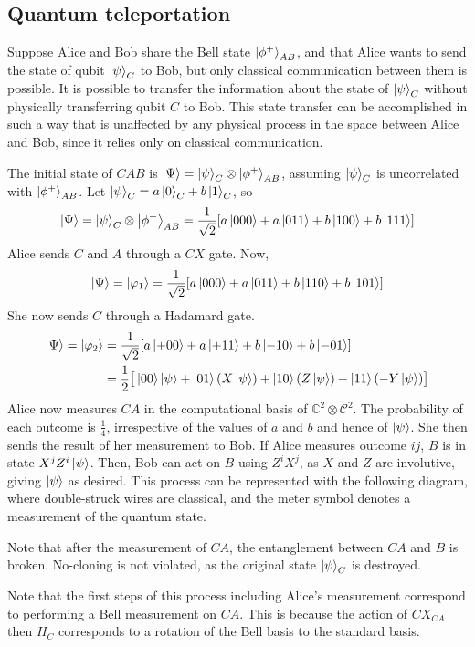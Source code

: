 \subsection{Quantum teleportation}
Suppose Alice and Bob share the Bell state \( \ket{\phi^+}_{AB} \), and that Alice wants to send the state of qubit \( \ket{\psi}_C \) to Bob, but only classical communication between them is possible.
It is possible to transfer the information about the state of \( \ket{\psi}_C \) without physically transferring qubit \( C \) to Bob.
This state transfer can be accomplished in such a way that is unaffected by any physical process in the space between Alice and Bob, since it relies only on classical communication.

The initial state of \( C A B \) is \( \ket{\Psi} = \ket{\psi}_C \otimes \ket{\phi^+}_{AB} \), assuming \( \ket{\psi}_C \) is uncorrelated with \( \ket{\phi^+}_{AB} \).
Let \( \ket{\psi}_C = a \ket{0}_C + b \ket{1}_C \), so
\[ \ket{\Psi} = \ket{\psi}_C \otimes \ket{\phi^+}_{AB} = \frac{1}{\sqrt{2}} \qty[a \ket{000} + a \ket{011} + b \ket{100} + b \ket{111}] \]
Alice sends \( C \) and \( A \) through a \( CX \) gate.
Now,
\[ \ket{\Psi} = \ket{\varphi_1} = \frac{1}{\sqrt{2}} \qty[a \ket{000} + a \ket{011} + b \ket{110} + b \ket{101}] \]
She now sends \( C \) through a Hadamard gate.
\begin{align*}
    \ket{\Psi} = \ket{\varphi_2} &= \frac{1}{\sqrt{2}} \qty[a \ket{+00} + a \ket{+11} + b \ket{-10} + b \ket{-01}] \\
    &= \frac{1}{2} \big[\ket{00} \ket{\psi} + \ket{01} (X \ket{\psi}) + \ket{10} (Z \ket{\psi}) + \ket{11} (-Y\ket{\psi})\big]
\end{align*}
Alice now measures \( CA \) in the computational basis of \( \mathbb C^2 \otimes \mathcal C^2 \).
The probability of each outcome is \( \frac{1}{4} \), irrespective of the values of \( a \) and \( b \) and hence of \( \ket{\psi} \).
She then sends the result of her measurement to Bob.
If Alice measures outcome \( ij \), \( B \) is in state \( X^j Z^i \ket{\psi} \).
Then, Bob can act on \( B \) using \( Z^i X^j \), as \( X \) and \( Z \) are involutive, giving \( \ket{\psi} \) as desired.
This process can be represented with the following diagram, where double-struck wires are classical, and the meter symbol denotes a measurement of the quantum state.
\begin{center}
    \leavevmode
\end{center}
Note that after the measurement of \( CA \), the entanglement between \( CA \) and \( B \) is broken.
No-cloning is not violated, as the original state \( \ket{\psi}_C \) is destroyed.

Note that the first steps of this process including Alice's measurement correspond to performing a Bell measurement on \( CA \).
This is because the action of \( CX_{CA} \) then \( H_C \) corresponds to a rotation of the Bell basis to the standard basis.
